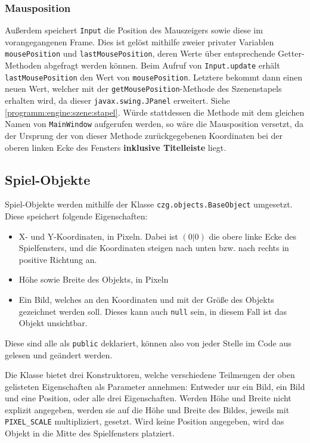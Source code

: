 \begin{sloppypar}
\subsubsection{Mausposition}

Außerdem speichert \texttt{Input} die Position des Mauszeigers
sowie diese im vorangegangenen Frame. Dies ist gelöst mithilfe
zweier privater Variablen \texttt{mousePosition} und
\texttt{lastMousePosition}, deren Werte über entsprechende
Getter-Methoden abgefragt werden können. Beim Aufruf von
\texttt{Input.update} erhält \texttt{lastMousePosition} den
Wert von \texttt{mousePosition}. Letztere bekommt dann einen
neuen Wert, welcher mit der \texttt{getMousePosition}-Methode
des Szenenstapels erhalten wird, da dieser \texttt{javax.swing.JPanel}
erweitert. Siehe \ref{programm:engine:szene:stapel}. Würde
stattdessen die Methode mit dem gleichen Namen von \texttt{MainWindow}
aufgerufen werden, so wäre die Mausposition versetzt, da der
Ursprung der von dieser Methode zurückgegebenen Koordinaten
bei der oberen linken Ecke des Fensters \textbf{inklusive Titelleiste}
liegt.

\subsection{Spiel-Objekte}

Spiel-Objekte werden mithilfe der Klasse \texttt{czg.objects.BaseObject}
umgesetzt. Diese speichert folgende Eigenschaften:

\begin{itemize}
	\item X- und Y-Koordinaten, in Pixeln. Dabei ist $(0|0)$ die
		  obere linke Ecke des Spielfensters, und die Koordinaten
		  steigen nach unten bzw. nach rechts in positive Richtung an.
	\item Höhe sowie Breite des Objekts, in Pixeln
	\item Ein Bild, welches an den Koordinaten und mit der Größe
	      des Objekts gezeichnet werden soll. Dieses kann auch
	      \texttt{null} sein, in diesem Fall ist das Objekt
	      unsichtbar.
\end{itemize}

Diese sind alle als \texttt{public} deklariert, können also
von jeder Stelle im Code aus gelesen und geändert werden.

Die Klasse bietet drei Konstruktoren, welche verschiedene
Teilmengen der oben gelisteten Eigenschaften als Parameter
annehmen: Entweder nur ein Bild, ein Bild und eine Position,
oder alle drei Eigenschaften. Werden Höhe und Breite nicht
explizit angegeben, werden sie auf die Höhe und Breite des
Bildes, jeweils mit \texttt{PIXEL\_SCALE} multipliziert,
gesetzt. Wird keine Position angegeben, wird das Objekt
in die Mitte des Spielfensters platziert.


\end{sloppypar}
